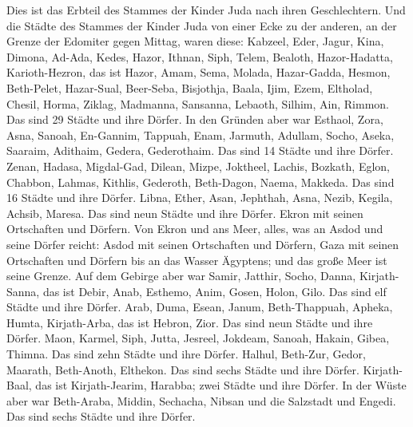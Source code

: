  Dies ist das Erbteil des Stammes der Kinder Juda nach
ihren Geschlechtern.  Und die Städte des Stammes der
Kinder Juda von einer Ecke zu der anderen, an der Grenze der Edomiter
gegen Mittag, waren diese: Kabzeel, Eder, Jagur,  Kina,
Dimona, Ad-Ada,  Kedes, Hazor, Ithnan, 
Siph, Telem, Bealoth,  Hazor-Hadatta, Karioth-Hezron, das
ist Hazor,  Amam, Sema, Molada, 
Hazar-Gadda, Hesmon, Beth-Pelet,  Hazar-Sual, Beer-Seba,
Bisjothja,  Baala, Ijim, Ezem,  Eltholad,
Chesil, Horma,  Ziklag, Madmanna, Sansanna,
 Lebaoth, Silhim, Ain, Rimmon. Das sind 29 Städte und
ihre Dörfer.  In den Gründen aber war Esthaol, Zora,
Asna,  Sanoah, En-Gannim, Tappuah, Enam, 
Jarmuth, Adullam, Socho, Aseka,  Saaraim, Adithaim,
Gedera, Gederothaim. Das sind 14 Städte und ihre Dörfer. 
Zenan, Hadasa, Migdal-Gad,  Dilean, Mizpe, Joktheel,
 Lachis, Bozkath, Eglon,  Chabbon, Lahmas,
Kithlis,  Gederoth, Beth-Dagon, Naema, Makkeda. Das sind
16 Städte und ihre Dörfer.  Libna, Ether, Asan,
 Jephthah, Asna, Nezib,  Kegila, Achsib,
Maresa. Das sind neun Städte und ihre Dörfer.  Ekron mit
seinen Ortschaften und Dörfern.  Von Ekron und ans Meer,
alles, was an Asdod und seine Dörfer reicht:  Asdod mit
seinen Ortschaften und Dörfern, Gaza mit seinen Ortschaften und Dörfern
bis an das Wasser Ägyptens; und das große Meer ist seine Grenze.
 Auf dem Gebirge aber war Samir, Jatthir, Socho,
 Danna, Kirjath-Sanna, das ist Debir, 
Anab, Esthemo, Anim,  Gosen, Holon, Gilo. Das sind elf
Städte und ihre Dörfer.  Arab, Duma, Esean,
 Janum, Beth-Thappuah, Apheka,  Humta,
Kirjath-Arba, das ist Hebron, Zior. Das sind neun Städte und ihre
Dörfer.  Maon, Karmel, Siph, Jutta, 
Jesreel, Jokdeam, Sanoah,  Hakain, Gibea, Thimna. Das
sind zehn Städte und ihre Dörfer.  Halhul, Beth-Zur,
Gedor,  Maarath, Beth-Anoth, Elthekon. Das sind sechs
Städte und ihre Dörfer.  Kirjath-Baal, das ist
Kirjath-Jearim, Harabba; zwei Städte und ihre Dörfer.  In
der Wüste aber war Beth-Araba, Middin, Sechacha,  Nibsan
und die Salzstadt und Engedi. Das sind sechs Städte und ihre Dörfer.

